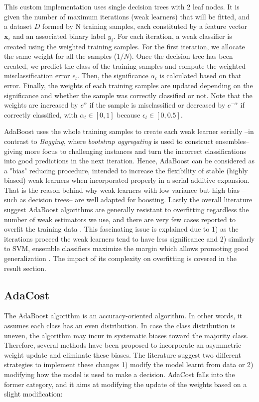 \documentclass[conference]{IEEEtran}
\begin{document}
This custom implementation uses single decision trees with 2 leaf nodes. It is given the number of maximum iterations (weak learners) that will be fitted, and a dataset $D$ formed by N training samples, each constituted by a feature vector $\boldsymbol{x}_i$ and an associated binary label $y_i$. For each iteration, a weak classifier is created using the weighted training samples. For the first iteration, we allocate the same weight for all the samples ($1/N$). Once the decision tree has been created, we predict the class of the training samples and compute the weighted misclassification error $\epsilon_t$. Then, the significance $\alpha_t$ is calculated based on that error. Finally, the weights of each training samples are updated depending on the significance and whether the sample was correctly classified or not. Note that the weights are increased by $e^{\alpha}$ if the sample is misclassified or decreased by $e^{-\alpha}$ if correctly classified, with  $\alpha_t \in [0,1]$ because $\epsilon_t \in [0,0.5]$. 

AdaBoost uses the whole training samples to create each weak learner serially --in contrast to \textit{Bagging}, where \textit{bootstrap aggregating} is used to construct ensembles-- giving more focus to challenging instances and turn the incorrect classifications into good predictions in the next iteration. Hence, AdaBoost can be considered as a "bias" reducing procedure, intended to increase the flexibility of stable (highly biased) weak learners when incorporated properly in a serial additive expansion. That is the reason behind why weak learners with low variance but high bias --such as decision trees-- are well adapted for boosting. Lastly the overall literature suggest AdaBoost algorithms are generally resistant to overfitting regardless the number of weak estimators we use, and there are very few cases reported to overfit the training data \cite{BoostingStats}. This fascinating issue is explained due to 1) as the iterations proceed the weak learners tend to have less significance and 2) similarly to SVM, ensemble classifiers maximize the margin which allows promoting good generalization \cite{margin_adaboost}. The impact of its complexity on overfitting is covered in the result section.

\subsection{AdaCost}
The AdaBoost algorithm is an accuracy-oriented algorithm. In other words, it assumes each class has an even distribution. In case the class distribution is uneven, the algorithm may incur in systematic biases toward the majority class. Therefore, several methods have been proposed to incorporate an asymmetric weight update and eliminate these biases. The literature suggest two different strategies to implement these changes \cite{need_boosting} 1) modify the model learnt from data or 2) modifying how the model is used to make a decision. AdaCost falls into the former category, and it aims at modifying the update of the weights based on a slight modification:
\end{document}
